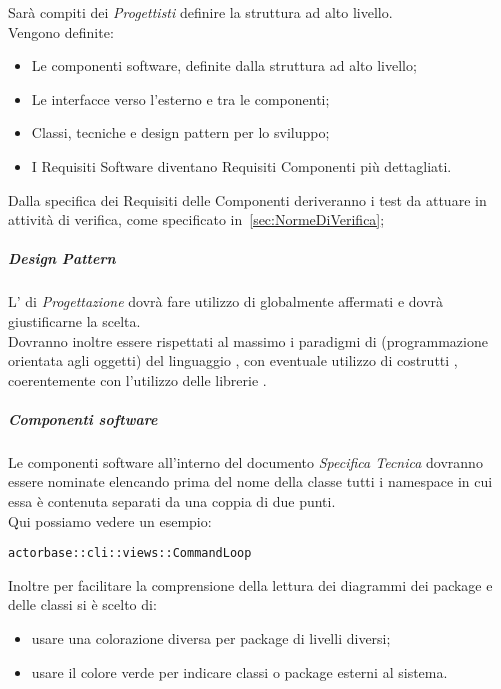 \documentclass{scalatekids-article}
\begin{document}
Sarà compiti dei \textit{Progettisti} definire la struttura ad alto livello.\\
Vengono definite:
\begin{itemize}
\item Le componenti software, definite dalla struttura ad alto livello;
\item Le interfacce verso l'esterno e tra le componenti;
\item Classi, tecniche e design pattern per lo sviluppo;
\item I Requisiti Software diventano Requisiti Componenti più dettagliati.
\end{itemize}

Dalla specifica dei Requisiti delle Componenti deriveranno i test da attuare in
attività di verifica, come specificato in~\ref{sec:NormeDiVerifica};


\subparagraph{Design Pattern}

L' di \textit{Progettazione} dovrà fare utilizzo di
 globalmente affermati e dovrà giustificarne la
scelta.\\Dovranno inoltre essere rispettati al massimo i paradigmi di
 (programmazione orientata agli oggetti) del linguaggio
, con eventuale utilizzo di costrutti ,
coerentemente con l'utilizzo delle librerie \textit{}.

\subparagraph{Componenti software}

Le componenti software all'interno del documento \textit{Specifica Tecnica}
dovranno essere nominate elencando prima del nome della classe tutti i namespace
in cui essa è contenuta separati da una coppia di due punti.\\ Qui possiamo
vedere un esempio:
\begin{center} \verb=actorbase::cli::views::CommandLoop=
\end{center} Inoltre per facilitare la comprensione della lettura dei diagrammi
dei package e delle classi si è scelto di:
\begin{itemize}
\item usare una colorazione diversa per package di livelli diversi;
\item usare il colore verde per indicare classi o package esterni al sistema.
\end{itemize}
\end{document}
